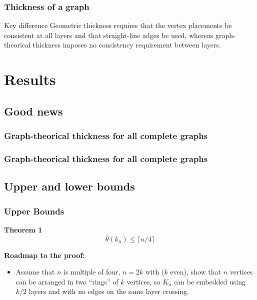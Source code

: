 \documentclass[12 pt]{beamer}
\begin{document}
\begin{frame}{4}
    \frametitle{Thickness of a graph}
  
    \begin{alertblock}{Key difference}
    Geometric thickness requires that the vertex placements be consistent at all layers and that straight-line adges be used, whereas graph-theorical thickness imposes no consistency requirement between layers.
    \end{alertblock}
\end{frame}

\section{Results}

    \subsection{Good news}

\begin{frame}{5}
    \frametitle{Graph-theorical thickness for all complete graphs}
    


\end{frame}

\begin{frame}{5}
    \frametitle{Graph-theorical thickness for all complete graphs}
    
   
\end{frame}

    \subsection{Upper and lower bounds}

\begin{frame}{}
    \frametitle{Upper Bounds}
    
    \begin{block}{\textbf{Theorem 1}}
    $$\bar{\theta} (k_{n}) \leq \lceil n/4 \rceil $$
    \end{block}
    
    \pause
    
    \textbf{Roadmap to the proof:}
    
    \begin{itemize}
        \item Assume that $n$ is multiple of four, $n = 2k$ with ($k$ even), show that $n$ vertices can be arranged in two ``rings'' of $k$ vertices, so $K_{n}$ can be embedded using $k/2$ layers and with no edges on the same layer crossing.
    \end{itemize}
\end{frame}
\end{document}
